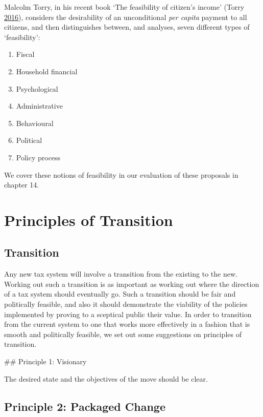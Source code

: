 \documentclass[]{tufte-handout}
\providecommand{\tightlist}{%
  \setlength{\itemsep}{0pt}\setlength{\parskip}{0pt}}
\begin{document}
Malcolm Torry, in his recent book `The feasibility of citizen's income'
(Torry \protect\hyperlink{ref-Torry2016}{2016}), considers the
desirability of an unconditional \emph{per capita} payment to all
citizens, and then distinguishes between, and analyses, seven different
types of `feasibility':

\begin{enumerate}
\def\labelenumi{\arabic{enumi}.}
\tightlist
\item
  Fiscal
\item
  Household financial
\item
  Psychological
\item
  Administrative
\item
  Behavioural
\item
  Political
\item
  Policy process
\end{enumerate}

We cover these notions of feasibility in our evaluation of these
proposals in chapter 14.

\hypertarget{principles-of-transition}{%
\section{Principles of Transition}\label{principles-of-transition}}

\hypertarget{transition}{%
\subsection{Transition}\label{transition}}

Any new tax system will involve a transition from the existing to the
new. Working out such a transition is as important as working out where
the direction of a tax system should eventually go. Such a transition
should be fair and politically feasible, and also it should demonstrate
the viability of the policies implemented by proving to a sceptical
public their value. In order to transition from the current system to
one that works more effectively in a fashion that is smooth and
politically feasible, we set out some suggestions on principles of
transition.

\#\# Principle 1: Visionary

The desired state and the objectives of the move should be clear.

\hypertarget{principle-2-packaged-change}{%
\subsection{Principle 2: Packaged
Change}\label{principle-2-packaged-change}}
\end{document}
